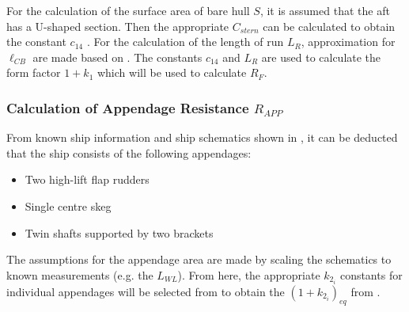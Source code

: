 For the calculation of the surface area of bare hull $S$, it is assumed that the aft has a U-shaped section. Then the appropriate $C_{stern}$ can be calculated to obtain the constant $c_{14}$ . For the calculation of the length of run $L_R$, approximation for $\ell_{CB}$ are made based on . The constants $c_{14}$ and $L_R$ are used to calculate the form factor $1+k_1$ which will be used to calculate $R_F$.

\subsubsection*{Calculation of Appendage Resistance $R_{APP}$}

From known ship information and ship schematics shown in , it can be deducted that the ship consists of the following appendages:

\begin{itemize}
    \setlength\itemsep{0em}
    \item Two high-lift flap rudders
    \item Single centre skeg
    \item Twin shafts supported by two brackets
\end{itemize}

The assumptions for the appendage area are made by scaling the schematics to known measurements (e.g. the $L_{WL}$). From here, the appropriate $k_{2_i}$ constants for individual appendages will be selected from  to obtain the $(1+k_{2_i})_{eq}$ from .

